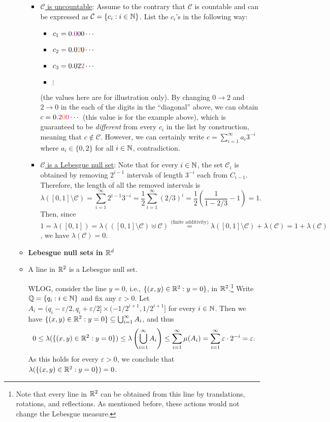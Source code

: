 \begin{enumerate}
\begin{itemize}
\begin{pf}
\begin{itemize}
\item \underline{\(\mathcal{C}\) is uncountable}: Assume to the contrary that
\(\mathcal{C}\) is countable and can be expressed as
\(\mathcal{C}=\{c_i:i\in\mathbb{N}\}\). List the \(c_i\)'s in the following way:
\begin{itemize}
\item \(c_1=0.{\color{violet}0}00\cdots\)
\item \(c_2=0.0\orc{2}0\cdots\)
\item \(c_3=0.02{\color{magenta}2}\cdots\)
\item \(\vdots\)
\end{itemize}
(the values here are for illustration only). By changing \(0\to 2\) and \(2\to
0\) in the each of the digits in the ``diagonal'' above, we can obtain
\(c=0.\vc{2}\orc{0}\mgc{0}\cdots\) (this value is for the example above), which
is guaranteed to be \emph{different} from every \(c_i\) in the list by
construction, meaning that \(c\notin\mathcal{C}\). However, we can certainly
write \(c=\sum_{i=1}^{\infty}a_i3^{-i}\) where \(a_i\in\{0,2\}\) for all
\(i\in\mathbb{N}\), contradiction.
\item \underline{\(\mathcal{C}\) is a Lebesgue null set}: Note that for every
\(i\in\mathbb{N}\), the set \(\mathcal{C}_i\) is obtained by removing \(2^{i-1}\)
intervals of length \(3^{-i}\) each from \(C_{i-1}\). Therefore, the length of
all the removed intervals is
\[
\lambda([0,1]\setminus\mathcal{C})=\sum_{i=1}^{\infty}2^{i-1}3^{-i}
=\frac{1}{2}\sum_{i=1}^{\infty}(2/3)^{i}
=\frac{1}{2}\left(\frac{1}{1-2/3}-1\right)
=1.
\]
Then, since \(1=\lambda([0,1])=\lambda(([0,1]\setminus \mathcal{C})\uplus\mathcal{C})
\overset{\text{(finite additivity)}}{=}\lambda([0,1]\setminus
\mathcal{C})+\lambda(\mathcal{C})=1+\lambda(\mathcal{C})\),
we have \(\lambda(\mathcal{C})=0\).
\end{itemize}
\end{pf}
\item[] \textbf{Lebesgue null sets in \(\mathbb{R}^d\)}
\item A line in \(\mathbb{R}^2\) is a Lebesgue null set.

\begin{pf}
WLOG, consider the line \(y=0\), i.e., \(\{(x,y)\in\mathbb{R}^2:y=0\}\), in
\(\mathbb{R}^2\).\footnote{Note that every line in \(\mathbb{R}^2\) can be obtained from this
line by translations, rotations, and reflections. As mentioned before, these
actions would not change the Lebesgue measure.} Write \(\mathbb{Q}=\{q_i:i\in\mathbb{N}\}\) and
fix any \(\varepsilon>0\). Let
\(A_i=(q_i-\varepsilon/2,q_i+\varepsilon/2]\times (-1/2^{i+1},1/2^{i+1}]\) for
every \(i\in\mathbb{N}\). Then we have \(\{(x,y)\in\mathbb{R}^2:y=0\}\subseteq
\bigcup_{i=1}^{\infty}A_i\), and thus
\[
0\le\lambda(\{(x,y)\in\mathbb{R}^2:y=0\})\le\lambda\left(\bigcup_{i=1}^{\infty}A_i\right)
\le\sum_{i=1}^{\infty}\mu(A_i)
=\sum_{i=1}^{\infty}\varepsilon\cdot 2^{-i}=\varepsilon.
\]
As this holds for every \(\varepsilon>0\), we conclude that
\(\lambda(\{(x,y)\in\mathbb{R}^2:y=0\})=0\).
\end{pf}


\end{itemize}
\end{enumerate}
